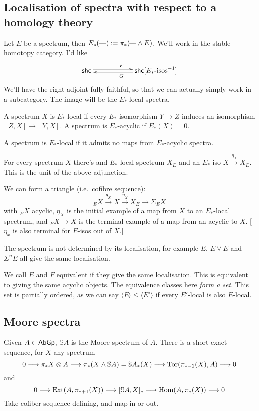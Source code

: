 \documentclass[11pt]{article}
\newcommand{\KanSemResponse}[1]
{
\thispagestyle{fancy}
\subsection*{#1}
}
\begin{document}
\begin{MarkusLocalisationPractice}
\KanSemResponse
{Localisation of spectra with respect to a homology theory}
Let $E$ be a spectrum, then $E_*(\textup{---}):=\pi_*(\textup{---}\wedge E)$. We'll work in the stable homotopy category. I'd like
\[\xymatrix@R=.3cm@C=2cm{
\mathsf{shc}  \ar@<.6ex>[r]^{F}&
\mathsf{shc}[\textup{$E_*$-isos}^{-1}] \ar@<.4ex>[l]^{G}\\
}\]
We'll have the right adjoint fully faithful, so that we can actually simply work in a subcategory. The image will be the $E_*$-local spectra.
\begin{defn*}
A spectrum $X$ is $E_*$-local if every $E_*$-isomorphism $Y\to Z$ induces an isomorphism $[Z,X]\to[Y,X]$. A spectrum is $E_*$-acyclic if $E_*(X)=0$.
\end{defn*}
\begin{lem*}
A spectrum is $E_*$-local if it admits no maps from $E_*$-acyclic spectra.
\end{lem*}
\begin{thm*}
For every spectrum $X$ there's and $E_*$-local spectrum $X_E$ and an $E_*$-iso $X\overset{\eta_X}{\to} X_E$. This is the unit of the above adjunction.
\end{thm*}
We can form a triangle (i.e.\ cofibre sequence):
\[{_E}X\overset{\theta_X}{\to}X\overset{\eta_X}{\to}X_E\to\Sigma{{_E}X}\]
with ${_E}X$ acyclic, $\eta_X$ is the initial example of a map from $X$ to an $E_*$-local spectrum, and $_EX\to X$ is the terminal example of a map from an acyclic to $X$. [$\eta_x$ is also terminal for $E$-isos out of $X$.]

The spectrum is not determined by its localisation, for example $E$, $E\vee E$ and $\Sigma^nE$ all give the same localisation.
\begin{defn*}
We call $E$ and $F$ equivalent if they give the same localisation. This is equivalent to giving the same acyclic objects. The equivalence classes here \emph{form a set}. This set is partially ordered, as we can say $\langle E\rangle\leq\langle E'\rangle$ if every $E'$-local is also $E$-local.
\end{defn*}
\subsection*{Moore spectra}

\begin{exmp*} Given $A\in\operatorname{{\mathsf{AbGp}}}$, $\mathbb{S}A$ is the Moore spectrum of $A$. There is a short exact sequence, for $X$ any spectrum
\[0\longrightarrow\pi_*X\otimes A\longrightarrow\pi_*(X\wedge\mathbb{S}A)=\mathbb{S}A_*(X)\longrightarrow\operatorname{Tor}(\pi_{*-1}(X),A)\longrightarrow0\]
and
\[0\longrightarrow\operatorname{Ext}(A,\pi_{*+1}(X))\longrightarrow[\mathbb{S}A,X]_*\longrightarrow\operatorname{Hom}(A,\pi_*(X))\longrightarrow0\]
Take cofiber sequence defining, and map in or out.


\end{exmp*}
\end{MarkusLocalisationPractice}
\end{document}
